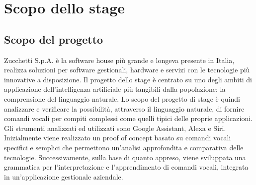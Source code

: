 \section{Scopo dello stage}
\subsection{Scopo del progetto}
Zucchetti S.p.A. è la software house più grande e longeva presente in Italia, realizza soluzioni per software gestionali, hardware e servizi con le tecnologie più innovative a disposizione.
Il progetto dello stage è centrato su uno degli ambiti di applicazione dell'intelligenza artificiale più tangibili dalla popolazione: la comprensione del linguaggio naturale.
Lo scopo del progetto di stage è quindi analizzare e verificare la possibilità, attraverso il linguaggio naturale, di fornire comandi vocali per compiti complessi come quelli tipici delle proprie applicazioni. Gli strumenti analizzati ed utilizzati sono Google Assistant, Alexa e Siri.
Inizialmente viene realizzato un proof of concept basato su comandi vocali specifici e semplici che permettono un'analisi approfondita e comparativa delle tecnologie. Successivamente, sulla base di quanto appreso, viene sviluppata una grammatica per l'interpretazione e l'apprendimento di comandi vocali, integrata in un'applicazione gestionale aziendale.

